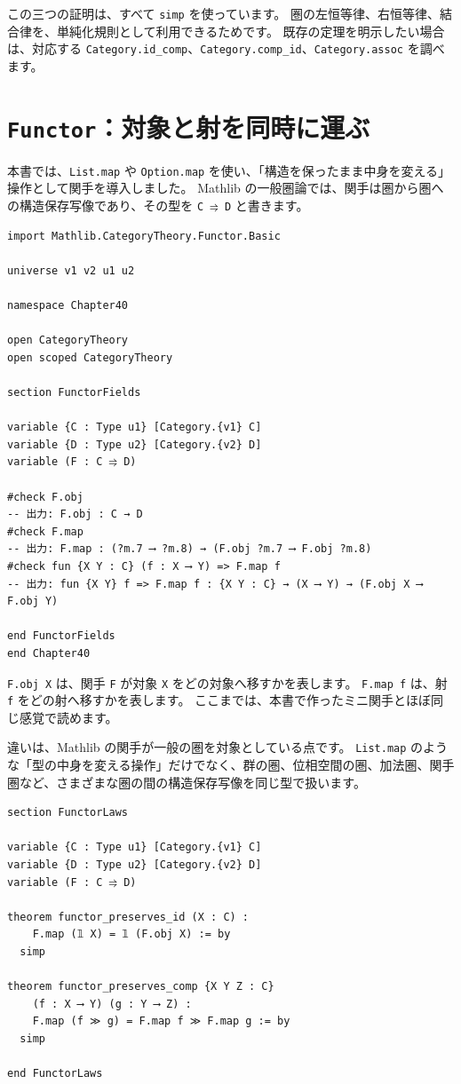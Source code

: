 この三つの証明は、すべて \texttt{simp} を使っています。
圏の左恒等律、右恒等律、結合律を、単純化規則として利用できるためです。
既存の定理を明示したい場合は、対応する \texttt{Category.id\_comp}、\texttt{Category.comp\_id}、\texttt{Category.assoc} を調べます。

\section{\texttt{Functor}：対象と射を同時に運ぶ}

本書では、\texttt{List.map} や \texttt{Option.map} を使い、「構造を保ったまま中身を変える」操作として関手を導入しました。
Mathlib の一般圏論では、関手は圏から圏への構造保存写像であり、その型を \texttt{C ⥤ D} と書きます。

\begin{listing}[htbp]
\begin{verbatim}
import Mathlib.CategoryTheory.Functor.Basic

universe v1 v2 u1 u2

namespace Chapter40

open CategoryTheory
open scoped CategoryTheory

section FunctorFields

variable {C : Type u1} [Category.{v1} C]
variable {D : Type u2} [Category.{v2} D]
variable (F : C ⥤ D)

#check F.obj
-- 出力: F.obj : C → D
#check F.map
-- 出力: F.map : (?m.7 ⟶ ?m.8) → (F.obj ?m.7 ⟶ F.obj ?m.8)
#check fun {X Y : C} (f : X ⟶ Y) => F.map f
-- 出力: fun {X Y} f => F.map f : {X Y : C} → (X ⟶ Y) → (F.obj X ⟶ F.obj Y)

end FunctorFields
end Chapter40
\end{verbatim}
\caption{\texttt{Functor.obj}・\texttt{Functor.map}}
\label{lst:ch40_functor_basic}
\end{listing}

\texttt{F.obj X} は、関手 \texttt{F} が対象 \texttt{X} をどの対象へ移すかを表します。
\texttt{F.map f} は、射 \texttt{f} をどの射へ移すかを表します。
ここまでは、本書で作ったミニ関手とほぼ同じ感覚で読めます。

違いは、Mathlib の関手が一般の圏を対象としている点です。
\texttt{List.map} のような「型の中身を変える操作」だけでなく、群の圏、位相空間の圏、加法圏、関手圏など、さまざまな圏の間の構造保存写像を同じ型で扱います。

\begin{listing}[htbp]
\begin{verbatim}
section FunctorLaws

variable {C : Type u1} [Category.{v1} C]
variable {D : Type u2} [Category.{v2} D]
variable (F : C ⥤ D)

theorem functor_preserves_id (X : C) :
    F.map (𝟙 X) = 𝟙 (F.obj X) := by
  simp

theorem functor_preserves_comp {X Y Z : C}
    (f : X ⟶ Y) (g : Y ⟶ Z) :
    F.map (f ≫ g) = F.map f ≫ F.map g := by
  simp

end FunctorLaws
\end{verbatim}
\caption{\texttt{functor\_preserves\_id}・\texttt{functor\_preserves\_comp}}
\label{lst:ch40_functor_laws}
\end{listing}

